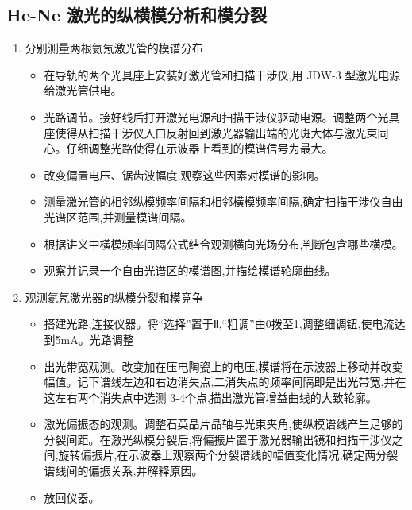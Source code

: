 \documentclass[12pt, a4paper]{article}
\begin{document}
\subsection{He-Ne 激光的纵横模分析和模分裂}
\begin{enumerate}
    \item 分别测量两根氦氖激光管的模谱分布
    \begin{itemize}
    \item 在导轨的两个光具座上安装好激光管和扫描干涉仪,用 JDW-3 型激光电源给激光管供电。
    \item 光路调节。接好线后打开激光电源和扫描干涉仪驱动电源。调整两个光具座使得从扫描干涉仪入口反射回到激光器输出端的光斑大体与激光束同心。仔细调整光路使得在示波器上看到的模谱信号为最大。
    \item 改变偏置电压、锯齿波幅度,观察这些因素对模谱的影响。
    \item 测量激光管的相邻纵模频率间隔和相邻橫模频率间隔,确定扫描干涉仪自由光谱区范围,并测量模谱间隔。
    \item 根据讲义中橫模频率间隔公式结合观测横向光场分布,判断包含哪些横模。
    \item 观察并记录一个自由光谱区的模谱图,并描绘模谱轮廓曲线。
    \end{itemize}
    
    \item 观测氦氖激光器的纵模分裂和模竞争
    \begin{itemize}
    \item 搭建光路,连接仪器。将“选择”置于Ⅱ,“粗调”由0拨至1,调整细调钮,使电流达到5mA。光路调整
    \item 出光带宽观测。改变加在压电陶瓷上的电压,模谱将在示波器上移动并改变幅值。记下谱线左边和右边消失点,二消失点的频率间隔即是出光带宽,并在这左右两个消失点中选测 3-4个点,描出激光管增益曲线的大致轮廓。
    \item 激光偏振态的观测。调整石英晶片晶轴与光束夹角,使纵模谱线产生足够的分裂间距。在激光纵模分裂后,将偏振片置于激光器输出镜和扫描干涉仪之间,旋转偏振片,在示波器上观察两个分裂谱线的幅值变化情况,确定两分裂谱线间的偏振关系,并解释原因。
    \item 放回仪器。
    \end{itemize}
\end{enumerate}
\end{document}
